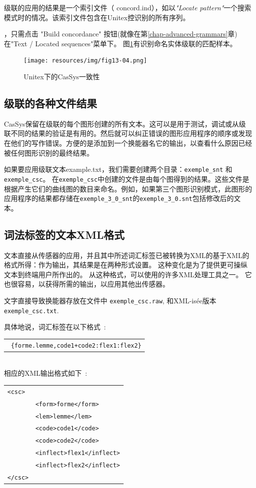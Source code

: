 级联的应用的结果是一个索引文件（\textit{} concord.ind），如以\textit{"Locate pattern"}一个搜索模式时的情况。该索引文件包含在Unitex控识别的所有序列。

\bigskip
{}，只需点击 "Build concordance" 按钮(就像在第\ref{chap-advanced-grammars}章)在"Text / Located sequences"菜单下。 
图\ref{fig13-04}有识别命名实体级联的匹配样本。


\begin{figure}[!htb]
  \centering
  \texttt{[image: resources/img/fig13-04.png]}
  \caption{Unitex下的CasSys一致性}
  \label{fig13-04}
\end{figure}

\subsection{级联的各种文件结果}

CasSys保留在级联的每个图形创建的所有文本。这可以是用于测试，调试或从级联不同的结果的验证是有用的。然后就可以纠正错误的图形应用程序的顺序或发现在他们的写作错误。方便的是添加到一个换能器名它的输出，以查看什么原因已经被任何图形识别的最终结果。

如果要应用级联文本example.txt，我们需要创建两个目录：\verb+exemple_snt+ 和\verb+exemple_csc+。
在\verb+exemple_csc+中创建的文件是由每个图得到的结果。这些文件是根据产生它们的曲线图的数目来命名。例如，如果第三个图形识别模式，此图形的应用程序的结果都存储在\verb+exemple_3+\newline\verb+_0_snt+的\verb+exemple_3_0.snt+包括修改后的文本。

\subsection{词法标签的文本XML格式}
文本直接从传感器的应用，并且其中所述词汇标签已被转换为XML的基于XML的格式所得：作为输出，其结果是在两种形式设置。
这种变化是为了提供更可操纵文本到终端用户所作出的。
从这种格式，可以使用的许多XML处理工具之一。
它也很容易，以获得所需的输出，以应用其他出传感器。

文字直接导致换能器存放在文件中 \verb+exemple_csc.raw+, 和XML-isée版本 \verb+exemple_csc.txt+.

具体地说，词汇标签在以下格式~:\\
\begin{tabular}{c}
\texttt{
\{forme.lemme,code1+code2:flex1:flex2\}}
\end{tabular}\\

相应的XML输出格式如下~:\\
\begin{tabular}{ll}
\texttt{<csc>}&\\
    &\texttt{<form>forme</form>}\\
    &\texttt{<lem>lemme</lem>}\\
    &\texttt{<code>code1</code>}\\
    &\texttt{<code>code2</code>}\\
    &\texttt{<inflect>flex1</inflect>}\\
    &\texttt{<inflect>flex2</inflect>}\\
\texttt{</csc>}&\\
\end{tabular}

